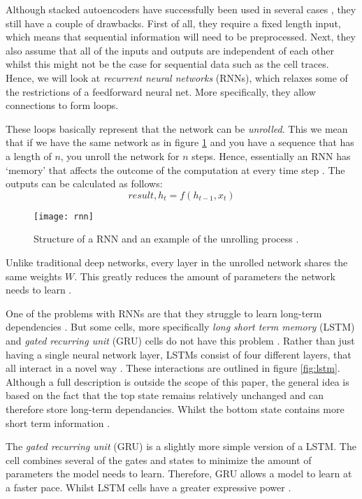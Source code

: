 Although stacked autoencoders have successfully been used in several cases \cite{deeplearningthesis,deeplearning2}, they still have a couple of drawbacks.
First of all, they require a fixed length input, which means that sequential information will need to be preprocessed.
Next, they also assume that all of the inputs and outputs are independent of each other \cite{britz_2016} whilst this might not be the case for sequential data such as the cell traces.
Hence, we will look at \textit{recurrent neural networks} (RNNs), which relaxes some of the restrictions of a feedforward neural net.
More specifically, they allow connections to form loops.

These loops basically represent that the network can be \textit{unrolled}.
This we mean that if we have the same network as in figure \ref{fig:rnn} and you have a sequence that has a length of $n$, you unroll the network for $n$ steps.
Hence, essentially an RNN has `memory' that affects the outcome of the computation at every time step \cite{britz_2016}.
The outputs can be calculated as follows:
$$\textit{result}, h_t = f(h_{t - 1}, x_t)$$

\begin{figure}[ht]
  \centering
  \texttt{[image: rnn]}
  \caption{Structure of a RNN and an example of the unrolling process \cite{britz_2016}.}
  \label{fig:rnn}
\end{figure}

Unlike traditional deep networks, every layer in the unrolled network shares the same weights $W$.
This greatly reduces the amount of parameters the network needs to learn \cite{britz_2016}.

One of the problems with RNNs are that they struggle to learn long-term dependencies \cite{bengio1994learning}.
But some cells, more specifically \textit{long short term memory} (LSTM) and \textit{gated recurring unit} (GRU) cells do not have this problem \cite{hochreiter1997long,LSTM,cho2014learning}.
Rather than just having a single neural network layer, LSTMs consist of four different layers, that all interact in a novel way \cite{LSTM}.
These interactions are outlined in figure \ref{fig:lstm}.
Although a full description is outside the scope of this paper, the general idea is based on the fact that the top state remains relatively unchanged and can therefore store long-term dependancies.
Whilst the bottom state contains more short term information \cite{LSTM,hochreiter1997long}.

The \textit{gated recurring unit} (GRU) is a slightly more simple version of a LSTM.
The cell combines several of the gates and states to minimize the amount of parameters the model needs to learn.
Therefore, GRU allows a model to learn at a faster pace.
Whilst LSTM cells have a greater expressive power \cite{hochreiter1997long,LSTM,cho2014learning}.

